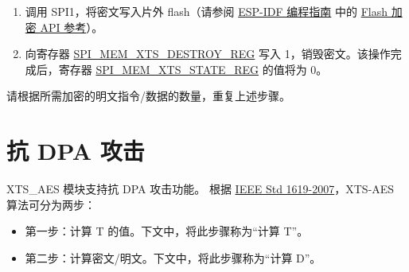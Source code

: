 \documentclass[main\_\_CN.tex]{subfiles}
\begin{document}
\begin{enumerate}
    \item 调用 SPI1，将密文写入片外 flash（请参阅 \href{https://docs.espressif.com/projects/esp-idf/en/latest/esp32h2/index.html}{ESP-IDF 编程指南} 中的 \href{https://docs.espressif.com/projects/esp-idf/en/latest/esp32c6/api-reference/peripherals/spi_flash/index.html#api-reference-flash-encrypt}{Flash 加密 API 参考}）。
    
    \item 向寄存器 \hyperref[regdesc:SPIMEMXTSDESTROYREG]{SPI\_MEM\_XTS\_DESTROY\_REG} 写入 1，销毁密文。该操作完成后，寄存器 \hyperref[regdesc:SPIMEMXTSSTATEREG]{SPI\_MEM\_XTS\_STATE\_REG} 的值将为 0。
    
\end{enumerate}

请根据所需加密的明文指令/数据的数量，重复上述步骤。


\section{抗 DPA 攻击}
\chipname{} XTS\_AES 模块支持抗 DPA 攻击功能。
根据 \href{https://ieeexplore.ieee.org/document/4493450}{IEEE Std 1619-2007}，XTS-AES 算法可分为两步：
\begin{itemize}
    \item 第一步：计算 T 的值。下文中，将此步骤称为“计算 T”。
    \item 第二步：计算密文/明文。下文中，将此步骤称为“计算 D”。
\end{itemize}
\end{document}
